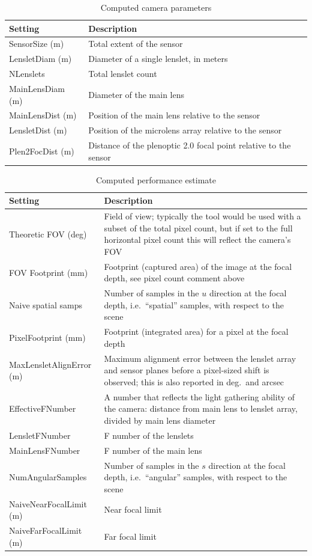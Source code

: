 \documentclass[onecolumn]{article}
\begin{document}
\begin{table}
\renewcommand{\arraystretch}{1.2}
\caption{Computed camera parameters}
\centering
\begin{tabular}{lp{24em}}
\toprule
Setting 				& Description \\
\midrule
SensorSize (m)		& Total extent of the sensor\\
LensletDiam (m)		& Diameter of a single lenslet, in meters\\
NLenslets 			& Total lenslet count\\
MainLensDiam (m)	& Diameter of the main lens\\
MainLensDist (m)	& Position of the main lens relative to the sensor\\
LensletDist (m)		& Position of the microlens array relative to the sensor\\
Plen2FocDist (m)	& Distance of the plenoptic 2.0 focal point relative to the sensor\\
\bottomrule
\end{tabular}
\label{tab_CamParams_Computed}
\end{table}

\begin{table}
\renewcommand{\arraystretch}{1.2}
\caption{Computed performance estimate}
\centering
\begin{tabular}{lp{22em}}
\toprule
Setting 				& Description \\
\midrule
Theoretic FOV (deg)	& Field of view; typically the tool would be used with a subset of the total pixel count, but if set to the full horizontal pixel count this will reflect the camera's FOV\\
FOV Footprint (mm)	& Footprint (captured area) of the image at the focal depth, see pixel count comment above\\
Naive spatial samps & Number of samples in the $u$ direction at the focal depth, i.e.~``spatial'' samples, with respect to the scene\\
PixelFootprint  (mm) & Footprint (integrated area) for a pixel at the focal depth\\
MaxLensletAlignError (m)	& Maximum alignment error between the lenslet array and sensor planes before a pixel-sized shift is observed; this is also reported in deg.\ and arcsec\\
EffectiveFNumber 	& A number that reflects the light gathering ability of the camera: distance from main lens to lenslet array, divided by main lens diameter\\
LensletFNumber		& F number of the lenslets\\
MainLensFNumber		& F number of the main lens\\
NumAngularSamples	& Number of samples in the $s$ direction at the focal depth, i.e.~``angular'' samples, with respect to the scene\\
NaiveNearFocalLimit (m) & Near focal limit\\
NaiveFarFocalLimit (m) & Far focal limit\\
\bottomrule
\end{tabular}
\label{tab_CamPerformanceMetrics}
\end{table}
\end{document}
